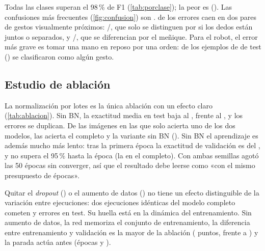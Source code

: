 Todas las clases superan el 98\,\% de F1 (\cref{tab:porclase}); la peor es \PeorClaseTest{}
(\PeorFoneTest). Las confusiones más frecuentes (\cref{fig:confusion}) son
\ConfusionesTestFinal. \ErroresEnPares{} de los \ErroresTestFinal{} errores caen en dos pares de
gestos visualmente próximos: /, que solo se distinguen por si los dedos están
juntos o separados, y /, que se diferencian por el meñique. Para el robot, el
error más grave es tomar una mano en reposo por una orden: \FalsasActivaciones{} de los
\NNoGestureTest{} ejemplos de  de test (\TasaFalsasActivaciones) se clasificaron
como algún gesto.

\subsection{Estudio de ablación}
\label{sec:ablacion}

\begin{table}[t]
  \centering
  \caption{Ablación: media de las semillas 42 y 43. Cada variante quita un único componente del
    modelo completo (lotes de 64); la última columna da las épocas de cada semilla.
    $^\dagger$ResNet18 se entrenó una sola vez.}
  \label{tab:ablacion}
  \small
  \setlength{\tabcolsep}{4.5pt}
  \TablaAblacion
\end{table}

La normalización por lotes es la única ablación con un efecto claro (\cref{tab:ablacion}). Sin BN,
la exactitud media en test baja al \AccTestMediaSinBn, frente al \AccTestMediaCompleto, y los
errores se duplican. De las imágenes en las que solo acierta uno de los dos modelos,
\SolocompletoSinBn{} las acierta el completo y \SolovarianteSinBn{} la variante sin BN
(\PmcnemarSinBn). Sin BN el aprendizaje es además mucho más lento: tras la primera época la
exactitud de validación es del \AccepocaunoSinBn, y no supera el 95\,\% hasta la época
\EpocanoventaycincoSinBn{} (la \EpocanoventaycincoCompleto{} en el completo). Con ambas semillas
agotó las 50 épocas sin converger, así que el resultado debe leerse como «con el mismo presupuesto
de épocas».

Quitar el \emph{dropout} (\PmcnemarSinDropout) o el aumento de datos (\PmcnemarSinAug) no tiene
un efecto distinguible de la variación entre ejecuciones: dos ejecuciones idénticas del modelo
completo cometen \ErroresTestCompleto{} y \ErroresTestCompletoS{} errores en test. Su huella está
en la dinámica del entrenamiento. Sin aumento de datos, la red memoriza el conjunto de
entrenamiento, la diferencia entre entrenamiento y validación es la mayor de la ablación
(\BrechaSinAug{} puntos, frente a \BrechaCompleto) y la parada actúa antes (épocas
\EpocasSinAug{} y \EpocasSinAugS).

